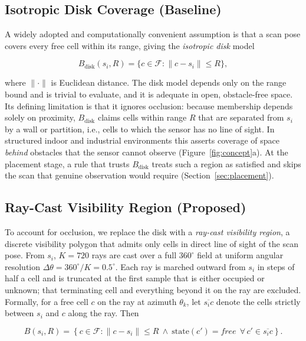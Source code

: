 \documentclass[sensors,article,submit,pdftex,moreauthors]{Definitions/mdpi}
\begin{document}
\subsection{Isotropic Disk Coverage (Baseline)}
\label{sec:disk}

A widely adopted and computationally convenient assumption is that a scan pose
covers every free cell within its range, giving the \emph{isotropic disk} model

\begin{equation}
B_{\mathrm{disk}}(s_i,R)=\{c\in\mathcal{F}:\lVert c-s_i\rVert \le R\},
\end{equation}

where $\lVert\cdot\rVert$ is Euclidean distance. The disk model depends only on
the range bound and is trivial to evaluate, and it is adequate in open,
obstacle-free space. Its defining limitation is that it ignores occlusion:
because membership depends solely on proximity, $B_{\mathrm{disk}}$ claims cells
within range $R$ that are separated from $s_i$ by a wall or partition, i.e.,
cells to which the sensor has no line of sight. In structured indoor and
industrial environments this asserts coverage of space \emph{behind} obstacles
that the sensor cannot observe (Figure~\ref{fig:concept}a). At the placement
stage, a rule that trusts $B_{\mathrm{disk}}$ treats such a region as satisfied
and skips the scan that genuine observation would require
(Section~\ref{sec:placement}).

\subsection{Ray-Cast Visibility Region (Proposed)}
\label{sec:visibility}

To account for occlusion, we replace the disk with a \emph{ray-cast visibility
region}, a discrete visibility polygon that admits only cells in direct line of
sight of the scan pose. From $s_i$, $K=720$ rays are cast over a full
$360^\circ$ field at uniform angular resolution
$\Delta\theta=360^\circ/K=0.5^\circ$. Each ray is marched outward from $s_i$ in
steps of half a cell and is truncated at the first sample that is either
occupied or unknown; that terminating cell and everything beyond it on the ray
are excluded. Formally, for a free cell $c$ on the ray at azimuth $\theta_k$, let
$\overline{s_i c}$ denote the cells strictly between $s_i$ and $c$ along the ray.
Then

\begin{equation}
B(s_i,R)=\left\{c\in\mathcal{F}:
\lVert c-s_i\rVert \le R \ \wedge\
\mathrm{state}(c')=\textit{free}\ \ \forall\, c'\in\overline{s_i c}\right\}.
\end{equation}
\end{document}
